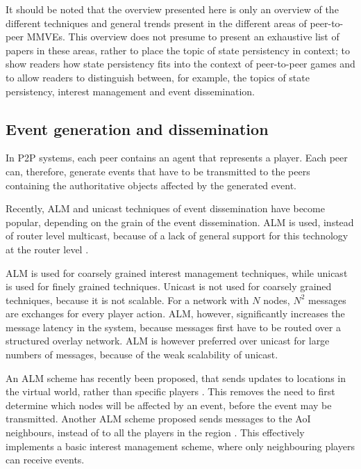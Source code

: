 It should be noted that the overview presented here is only an overview of the different techniques and general trends present in the different areas
of peer-to-peer MMVEs. This overview does not presume to present an exhaustive list of papers in these areas, rather to place the topic of state persistency in context; to show readers how state persistency fits into the context of peer-to-peer games and to allow readers to distinguish between, for example, the topics of state persistency, interest management and event dissemination.


\subsection{Event generation and dissemination}

In P2P systems, each peer contains an agent that represents a player. Each peer can, therefore, generate events that have to be transmitted to the peers containing the authoritative objects affected by the generated event.

Recently, ALM and unicast techniques of event dissemination have become popular, depending on the grain of the event dissemination. ALM is used, instead of router level multicast, because of a lack of general support for this technology at the router level \cite{ip_multicast_deployment_issues}.

ALM is used for coarsely grained interest management techniques, while unicast is used for finely grained techniques. Unicast is not used for
coarsely grained techniques, because it is not scalable. For a network with $N$ nodes, $N^2$ messages are exchanges for every player action. ALM,
however, significantly increases the message latency in the system, because messages first have to be routed over a structured overlay network. ALM
is however preferred over unicast for large numbers of messages, because of the weak scalability of unicast.

An ALM scheme has recently been proposed, that sends updates to locations in the virtual world, rather than specific players
\cite{Ghaffari_Delaunay_churn_mobility}. This removes the need to first determine which nodes will be affected by an event, before the event may be
transmitted. Another ALM scheme proposed sends messages to the AoI neighbours, instead of to all the players in the region
\cite{Seeger_area_based_gossip_multicast}. This effectively implements a basic interest management scheme, where only neighbouring players can
receive events.

